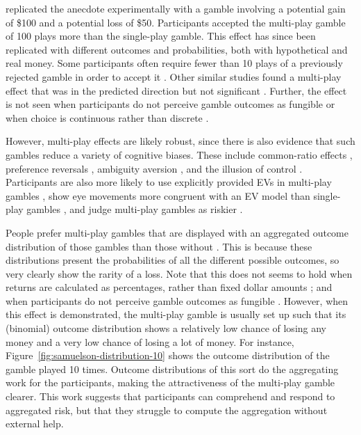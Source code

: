\documentclass[a4paper, nobind]{templates/ociamthesis}
\theoremstyle{definition}
\theoremstyle{definition}
\theoremstyle{definition}
\theoremstyle{definition}
\theoremstyle{remark}
\begin{document}
\textcite{wedell1994} replicated the \textcite{samuelson1963} anecdote experimentally with a gamble
involving a potential gain of \$100 and a potential loss of \$50. Participants
accepted the multi-play gamble of 100 plays more than the single-play gamble.
This effect has since been replicated with different outcomes and probabilities,
both with hypothetical and real money. Some participants often require fewer
than 10 plays of a previously rejected gamble in order to accept it \autocite{dekay2005,keren1991,montgomery1982,redelmeier1992}. Other similar studies found a
multi-play effect that was in the predicted direction but not significant
\autocite{barron2003,benartzi1999,klos2005,langer2001}. Further, the effect is not
seen when participants do not perceive gamble outcomes as fungible \autocite{dekay2006,dekay2005,dekay2011} or when choice is continuous rather than discrete
\autocite{bristow2011}.

However, multi-play effects are likely robust, since there is also evidence that
such gambles reduce a variety of cognitive biases. These include common-ratio
effects \autocite{keren1987,keren1991,dekay2006}, preference reversals
\autocite{wedell1990}, ambiguity aversion \autocite{liu2009}, and the illusion of control
\autocite{koehler1994}. Participants are also more likely to use explicitly provided EVs
in multi-play gambles \autocite{li2003}, show eye movements more congruent with an EV
model than single-play gambles \autocite{su2013}, and judge multi-play gambles as
riskier \autocite{joag1990}.

People prefer multi-play gambles that are displayed with an aggregated outcome
distribution of those gambles than those without \autocite{benartzi1999,redelmeier1992,klos2013,webb2017,coombs1971,venkatraman2006,dekay2005,langer2001,keren1991}. This is because these distributions
present the probabilities of all the different possible outcomes, so very
clearly show the rarity of a loss. Note that this does not seems to hold when
returns are calculated as percentages, rather than fixed dollar amounts
\autocite{stutzer2013}; and when participants do not perceive gamble outcomes as
fungible \autocite{dekay2005}. However, when this effect is demonstrated, the multi-play
gamble is usually set up such that its (binomial) outcome distribution shows a
relatively low chance of losing any money and a very low chance of losing a lot
of money. For instance, Figure~\ref{fig:samuelson-distribution-10} shows the
outcome distribution of the \textcite{samuelson1963} gamble played 10 times. Outcome
distributions of this sort do the aggregating work for the participants, making
the attractiveness of the multi-play gamble clearer. This work suggests that
participants can comprehend and respond to aggregated risk, but that they
struggle to compute the aggregation without external help.
\end{document}
